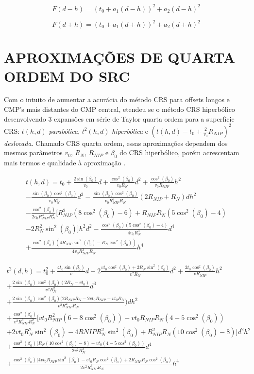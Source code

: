 \begin{equation}
\label{eq:3.9}
 F(d-h)=(t_0+a_1(d-h))^2+a_2(d-h)^2
\end{equation}

\begin{equation}
\label{eq:3.10}
 F(d+h)=(t_0+a_1(d+h))^2+a_2(d+h)^2
\end{equation}

\section{APROXIMAÇÕES DE QUARTA ORDEM DO SRC}

Com o intuito de aumentar a acurácia do método CRS para offsets longos e CMP's mais distantes do CMP central,
etendeu se o método CRS hiperbólico desenvolvendo 3 expansões 
em série de Taylor quarta ordem para a superfície CRS: 
$t(h,d)$ \textit{parabólica}, $t^2(h,d)$ \textit{hiperbólica} e $(t(h,d)-t_0+\frac{2}{v_0}R_{NIP})^2$
\textit{deslocada}. Chamado CRS quarta ordem, 
essas aproximações dependem dos mesmos parâmetros $v_0$, $R_N$, $R_{NIP}$ e $\beta_0$ do CRS hiperbólico,
porém acrescentam mais termos e qualidade à aproximação \cite{germam}.

\begin{multline}
\label{eq:3.11}
 t(h,d)=t_0+\frac{2\sin(\beta_0)}{v_0}d+\frac{\cos^2(\beta_0)}{v_0R_N}d^2+\frac{\cos^2(\beta_0)}{v_0R_{NIP}}h^2 \\
 -\frac{\sin(\beta_0)\cos^2(\beta_0)}{v_0R_N^2}d^3-\frac{\sin(\beta_0)\cos^2(\beta_0)}{v_0R_{NIP}^2R_N}(2R_{NIP}+R_N)dh^2 \\
 -\frac{\cos^2(\beta_0)}{2v_0R_{NIP}^3R_N^2}[R_{NIP}^2(8\cos^2(\beta_0)-6)+R_{NIP}R_N(5\cos^2(\beta_0)-4) \\
 -2R_N^2\sin^2(\beta_0)]h^2d^2-\frac{\cos^2(\beta_0)(5\cos^2(\beta_0)-4)}{4v_0R_N^3}d^4 \\
 +\frac{\cos^2(\beta_0)(4R_{NIP}\sin^2(\beta_0)-R_N\cos^2(\beta_0))}{4v_0R_{NIP}^3R_N}h^4 
\end{multline}

\begin{multline}
\label{eq:3.12}
 t^2(d,h)=t_0^2+\frac{4t_0\sin(\beta_0)}{v}d+2\frac{vt_0\cos^2(\beta_0)+2R_N\sin^2(\beta_0)}{v^2R_N}d^2+\frac{2t_0\cos^2(\beta_0)}{vR_{NIP}}h^2 \\
+\frac{2\sin(\beta_0)\cos^2(\beta_0)(2R_N-vt_0)}{v^2R_N^2}d^3 \\
+\frac{2\sin(\beta_0)\cos^2(\beta_0)(2R_{NIP}R_N-2vt_0R_{NIP}-vt_0R_N}{v^2R_{NIP}^2R_N})dh^2 \\
+\frac{\cos^2(\beta_0)}{v^2R_{NIP}^3R_N^2}[vt_0R_{NIP}^2(6-8\cos^2(\beta_0))+vt_0R_{NIP}R_N(4-5\cos^2(\beta_0)) \\
+2vt_0R_N^2\sin^2(\beta_0)-4R{NIP}R_N^2\sin^2(\beta_0)+R_{NIP}^2R_N(10\cos^2(\beta_0)-8)]d^2h^2 \\ 
+\frac{\cos^2(\beta_0)(R_N(10\cos^2(\beta_0)-8)+vt_0(4-5\cos^2(\beta_0))}{2v^2R_N^3}d^4 \\
+\frac{\cos^2(\beta_0)(4vt_0R_{NIP}\sin^2(\beta_0)-vt_0R_N\cos^2(\beta_0)+2R_{NIP}R_N\cos^2(\beta_0)}{2v^2R_{NIP}^3R_N}h^4
\end{multline}


